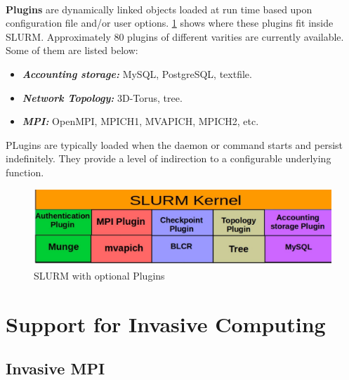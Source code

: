 \noindent
\\
\textbf{Plugins} are dynamically linked objects loaded at run time based upon configuration file and/or user options. \ref{fig:6} shows where these plugins fit inside SLURM. Approximately $80$ plugins of different varities are currently available. Some of them are listed below:\\
\begin{itemize}
\item \textbf{\textit{Accounting storage:}} MySQL, PostgreSQL, textfile.
\item \textbf{\textit{Network Topology:}} 3D-Torus, tree.
\item \textbf{\textit{MPI:}} OpenMPI, MPICH1, MVAPICH, MPICH2, etc.
\end{itemize}
PLugins are typically loaded when the daemon or command starts and persist indefinitely. They provide a level of indirection to a configurable underlying function.
\begin{figure}[h]
\centering
\includegraphics[width=1.0\textwidth]{./figures/plugin.pdf}
\vspace{-0.15in}
\caption{SLURM with optional Plugins}
\label{fig:6}
\end{figure}


\section{Support for Invasive Computing}
\subsection{Invasive MPI}

